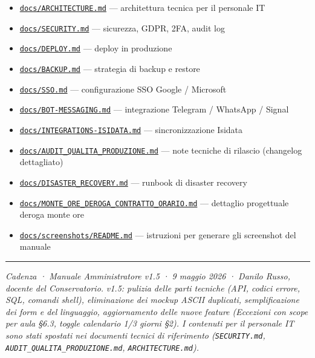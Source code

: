 \documentclass[11pt,a4paper]{article}
\begin{document}
\begin{itemize}
  \item \href{ARCHITECTURE.md}{\texttt{docs/ARCHITECTURE.md}} --- architettura tecnica per il personale IT
  \item \href{SECURITY.md}{\texttt{docs/SECURITY.md}} --- sicurezza, GDPR, 2FA, audit log
  \item \href{DEPLOY.md}{\texttt{docs/DEPLOY.md}} --- deploy in produzione
  \item \href{BACKUP.md}{\texttt{docs/BACKUP.md}} --- strategia di backup e restore
  \item \href{SSO.md}{\texttt{docs/SSO.md}} --- configurazione SSO Google / Microsoft
  \item \href{BOT-MESSAGING.md}{\texttt{docs/BOT-MESSAGING.md}} --- integrazione Telegram / WhatsApp / Signal
  \item \href{INTEGRATIONS-ISIDATA.md}{\texttt{docs/INTEGRATIONS-ISIDATA.md}} --- sincronizzazione Isidata
  \item \href{AUDIT_QUALITA_PRODUZIONE.md}{\texttt{docs/AUDIT\_QUALITA\_PRODUZIONE.md}} --- note tecniche di rilascio (changelog dettagliato)
  \item \href{DISASTER_RECOVERY.md}{\texttt{docs/DISASTER\_RECOVERY.md}} --- runbook di disaster recovery
  \item \href{MONTE_ORE_DEROGA_CONTRATTO_ORARIO.md}{\texttt{docs/MONTE\_ORE\_DEROGA\_CONTRATTO\_ORARIO.md}} --- dettaglio progettuale deroga monte ore
  \item \href{screenshots/README.md}{\texttt{docs/screenshots/README.md}} --- istruzioni per generare gli screenshot del manuale
\end{itemize}

\medskip\hrule\medskip

\textit{Cadenza · Manuale Amministratore v1.5 · 9 maggio 2026 · Danilo Russo, docente del Conservatorio.} \textit{v1.5: pulizia delle parti tecniche (API, codici errore, SQL, comandi shell), eliminazione dei mockup ASCII duplicati, semplificazione dei form e del linguaggio, aggiornamento delle nuove feature (Eccezioni con scope per aula §6.3, toggle calendario 1/3 giorni §2). I contenuti per il personale IT sono stati spostati nei documenti tecnici di riferimento (\texttt{SECURITY.md}, \texttt{AUDIT\_QUALITA\_PRODUZIONE.md}, \texttt{ARCHITECTURE.md}).}
\end{document}
